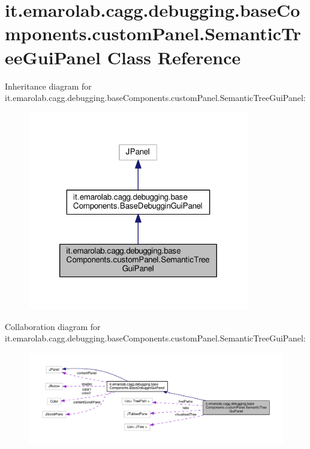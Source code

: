 \hypertarget{classit_1_1emarolab_1_1cagg_1_1debugging_1_1baseComponents_1_1customPanel_1_1SemanticTreeGuiPanel}{\section{it.\-emarolab.\-cagg.\-debugging.\-base\-Components.\-custom\-Panel.\-Semantic\-Tree\-Gui\-Panel Class Reference}
\label{classit_1_1emarolab_1_1cagg_1_1debugging_1_1baseComponents_1_1customPanel_1_1SemanticTreeGuiPanel}
}


Inheritance diagram for it.\-emarolab.\-cagg.\-debugging.\-base\-Components.\-custom\-Panel.\-Semantic\-Tree\-Gui\-Panel\-:\nopagebreak
\begin{figure}[H]
\begin{center}
\leavevmode
\includegraphics[width=274pt]{classit_1_1emarolab_1_1cagg_1_1debugging_1_1baseComponents_1_1customPanel_1_1SemanticTreeGuiPanel__inherit__graph}
\end{center}
\end{figure}


Collaboration diagram for it.\-emarolab.\-cagg.\-debugging.\-base\-Components.\-custom\-Panel.\-Semantic\-Tree\-Gui\-Panel\-:\nopagebreak
\begin{figure}[H]
\begin{center}
\leavevmode
\includegraphics[width=350pt]{classit_1_1emarolab_1_1cagg_1_1debugging_1_1baseComponents_1_1customPanel_1_1SemanticTreeGuiPanel__coll__graph}
\end{center}
\end{figure}
